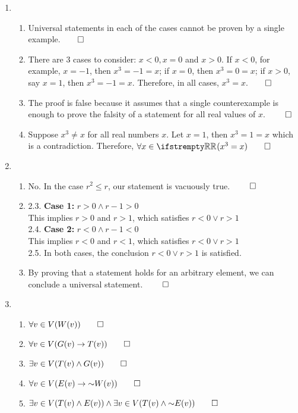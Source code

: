 \documentclass[12pt, a4paper]{article}
\begin{document}
\begin{enumerate}[Q\arabic*.]
\item
  \begin{enumerate}[(\alph*)]
    \item Universal statements in each of the cases cannot be proven by a single example.$\qed$
    \item There are 3 cases to consider: $x < 0, x = 0$ and $x > 0$. If $x < 0$, for example, $x = -1$, then $x^3 = -1 = x$; if $x = 0$, then $x^3 = 0 = x$; if $x > 0$, say $x = 1$, then $x^3 = -1 = x$. Therefore, in all cases, $x^3 = x$.$\qed$
    \item The proof is false because it assumes that a single counterexample is enough to prove the falsity of a statement for all real values of $x$. $\qed$
    \item Suppose $x^3 \neq x$ for all real numbers $x$. Let $x = 1$, then $x^3 = 1 = x$ which is a contradiction. Therefore, $\forall x \in \RR (x^3 = x) \qed$
  \end{enumerate}

\item 
  \begin{enumerate}[(\alph*)]
    \item No. In the case $r^2 \leq r$, our statement is vacuously true. $\qed$

    \item 2.3. \textbf{Case 1:} $r > 0 \land r-1>0$\\
      This implies $r>0$ and $r > 1$, which satisfies $r < 0 \lor r > 1$\\
    2.4. \textbf{Case 2:} $r < 0 \land r-1<0$\\
      This implies $r<0$ and $r < 1$, which satisfies $r < 0 \lor r > 1$\\
    2.5. In both cases, the conclusion $r < 0 \lor r > 1$ is satisfied.

  \item By proving that a statement holds for an arbitrary element, we can conclude a universal statement. $\qed$
  \end{enumerate}

  \item \begin{enumerate}[(\alph*)]
      \item $\forall v \in V (W(v)) \qed$
      \item $\forall v \in V (G(v) \rightarrow T(v)) \qed$
      \item $\exists v \in V (T(v) \land G(v)) \qed$
      \item $\forall v \in V (E(v) \rightarrow \neg W(v)) \qed$
      \item $\exists v \in V (T(v) \land E(v)) \land \exists v \in V (T(v) \land \neg E(v)) \qed$
  \end{enumerate}


\end{enumerate}
\end{document}
